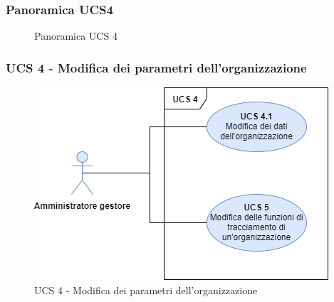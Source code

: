\subsubsection{Panoramica UCS4}

\begin{figure}[h]
	\centering	
	\caption{Panoramica UCS 4}
\end{figure}

\subsubsection{UCS 4 - Modifica dei parametri dell'organizzazione}%

\begin{figure}[h]
	\centering	
	\includegraphics[scale=0.53]{Sezioni/UseCase/Immagini/UCS4.png}
	\caption{UCS 4 - Modifica dei parametri dell'organizzazione}
\end{figure}

